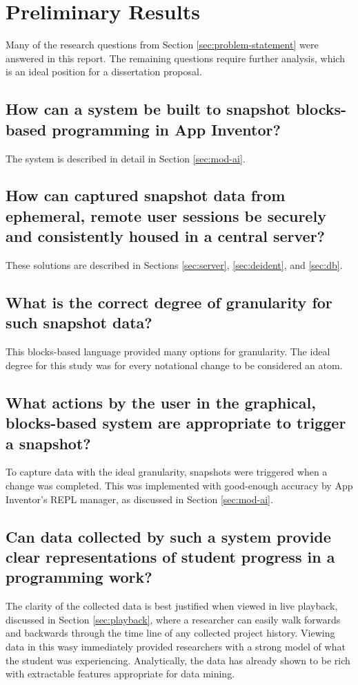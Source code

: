 \chapter{Preliminary Results} %
\label{chap:analysis}

Many of the research questions from Section \ref{sec:problem-statement} were answered in this report. The remaining questions require further analysis, which is an ideal position for a dissertation proposal. 

\section{How can a system be built to snapshot blocks-based programming in App Inventor? }
The system is described in detail in Section \ref{sec:mod-ai}.

\section{How can captured snapshot data from ephemeral, remote user sessions be securely and consistently housed in a central server? }
These solutions are described in Sections \ref{sec:server}, \ref{sec:deident}, and \ref{sec:db}.

\section{What is the correct degree of granularity for such snapshot data?}
This blocks-based language provided many options for granularity. The ideal degree for this study was for every notational change to be considered an atom.

\section{What actions by the user in the graphical, blocks-based system are appropriate to trigger a snapshot?}
To capture data with the ideal granularity, snapshots were triggered when a change was completed. This was implemented with good-enough accuracy by App Inventor's REPL manager, as discussed in Section \ref{sec:mod-ai}.

\section{Can data collected by such a system provide clear representations of student progress in a programming work?}
The clarity of the collected data is best justified when viewed in live playback, discussed in Section \ref{sec:playback}, where a researcher can easily walk forwards and backwards through the time line of any collected project history. Viewing data in this wasy immediately provided researchers with a strong model of what the student was experiencing. Analytically, the data has already shown to be rich with extractable features appropriate for data mining.

